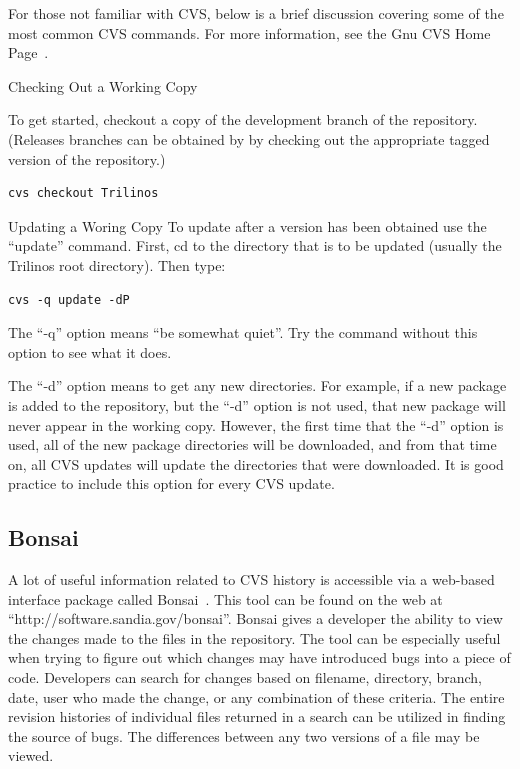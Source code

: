 \documentclass[12pt,relax]{TrilinosDevGuide}
\begin{document}
For those not familiar with CVS, below is a brief discussion covering some 
of the most common CVS commands.  For more information, see the Gnu CVS Home
Page~\cite{CVS}.

Checking Out a Working Copy

To get started, checkout a copy of the development branch of the repository.
(Releases branches can be obtained by by checking out the appropriate 
tagged version of the repository.)

\begin{verbatim}
cvs checkout Trilinos
\end{verbatim}

Updating a Woring Copy
To update after a version has been obtained use the ``update'' command.  
First, cd to the directory that is to be updated (usually the Trilinos root 
directory).  Then type:

\begin{verbatim}
cvs -q update -dP
\end{verbatim}

The ``-q'' option means ``be somewhat quiet''.  Try the command without this
option to see what it does.  

The ``-d'' option means to get any new directories.  For example, if a new 
package is added to the repository, but the ``-d'' option is not used, that 
new package will never appear in the working copy.  However, the first time 
that the ``-d'' option is used, all of the new package directories will be 
downloaded, and from that time on, all CVS updates will update the 
directories that were downloaded.  It is good practice to include this 
option for every CVS update.


\subsection{Bonsai}
A lot of useful information related to CVS history is accessible via a
web-based interface package called Bonsai~\cite{Bonsai}.  This tool can be 
found on the web at ``http://software.sandia.gov/bonsai''.  Bonsai gives a 
developer the ability to view the changes made to the files in the 
repository.  The tool can be especially useful when trying to figure out which 
changes may have introduced bugs into a piece of code.  Developers can search 
for changes based on filename, directory, branch, date, user who made the 
change, or any combination of these criteria.  The entire revision histories of
individual files returned in a search can be utilized in finding the source of 
bugs.  The differences between any two versions of a file may be viewed.  
\end{document}
